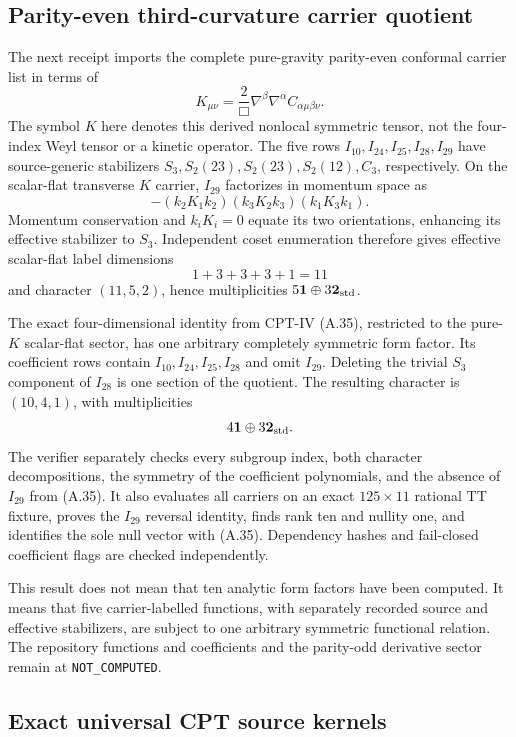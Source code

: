 \documentclass[11pt]{article}
\theoremstyle{definition}
\theoremstyle{remark}
\begin{document}
\subsection{Parity-even third-curvature carrier quotient}

The next receipt imports the complete pure-gravity parity-even conformal
carrier list in terms of
\[
 K_{\mu\nu}=\frac{2}{\Box}\nabla^\beta\nabla^\alpha
 C_{\alpha\mu\beta\nu}.
\]
The symbol $K$ here denotes this derived nonlocal symmetric tensor, not the
four-index Weyl tensor or a kinetic operator.  The five rows
$I_{10},I_{24},I_{25},I_{28},I_{29}$ have source-generic stabilizers
$S_3,S_2(23),S_2(23),S_2(12),C_3$, respectively.  On the scalar-flat
transverse $K$ carrier, $I_{29}$ factorizes in momentum space as
\[
 -(k_2K_1k_2)(k_3K_2k_3)(k_1K_3k_1).
\]
Momentum conservation and $k_iK_i=0$ equate its two orientations, enhancing
its effective stabilizer to $S_3$.  Independent coset enumeration therefore
gives effective scalar-flat label dimensions
\[
 1+3+3+3+1=11
\]
and character $(11,5,2)$, hence multiplicities
$5\mathbf1\oplus3\mathbf2_{\rm std}$.

The exact four-dimensional identity from CPT-IV (A.35), restricted to the
pure-$K$ scalar-flat sector, has one arbitrary completely symmetric form
factor.  Its coefficient rows contain $I_{10},I_{24},I_{25},I_{28}$ and
omit $I_{29}$.  Deleting the trivial $S_3$ component of $I_{28}$ is one
section of the quotient.  The resulting character is $(10,4,1)$, with
multiplicities
\[
 4\mathbf1\oplus3\mathbf2_{\rm std}.
\]
The verifier separately checks every subgroup index, both character
decompositions, the symmetry of the coefficient polynomials, and the absence
of $I_{29}$ from (A.35).  It also evaluates all carriers on an exact
$125\times11$ rational TT fixture, proves the $I_{29}$ reversal identity,
finds rank ten and nullity one, and identifies the sole null vector with
(A.35).  Dependency hashes and fail-closed coefficient flags are checked
independently.

This result does not mean that ten analytic form factors have been computed.
It means that five carrier-labelled functions, with separately recorded
source and effective stabilizers, are subject to one arbitrary symmetric
functional relation.  The
repository functions and coefficients and the parity-odd derivative sector
remain at \texttt{NOT\_COMPUTED}.

\subsection{Exact universal CPT source kernels}
\end{document}
